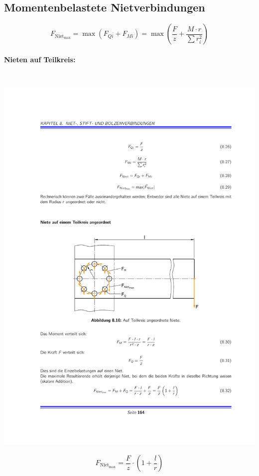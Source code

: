 	\subsection{Momentenbelastete Nietverbindungen} %
		\begin{equation*}
			F_{\text{Niet}_{\text{max}}} = \max (F_{Qi}+F_{Mi}) = \max \left( \frac{F}{z} + \frac{M \cdot r}{\sum r_i^2}\right)
		\end{equation*}

		\paragraph{Nieten auf Teilkreis:} %
			~
			\begin{center}
				\includegraphics[width=\columnwidth]{graphics/nietenteilkreis}
			\end{center}
			\begin{equation*}
				F_{\text{Niet}_{\text{max}}} = \frac{F}{z} \cdot \left( 1 + \frac{l}{r}\right)
			\end{equation*}


